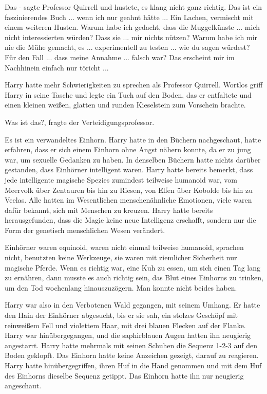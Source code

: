 \glqq{}Das -\grqq{} sagte Professor Quirrell und hustete, es klang nicht ganz richtig.
\glqq{}Das ist ein faszinierendes Buch ... wenn ich nur geahnt hätte ...\grqq{} Ein
Lachen, vermischt mit einem weiteren Husten. \glqq{}Warum habe ich gedacht, dass
die Muggelkünste ... mich nicht interessierten würden? Dass sie ... mir nichts
nützen? Warum habe ich mir nie die Mühe gemacht, es ... experimentell zu
testen ... wie du sagen würdest? Für den Fall ... dass meine Annahme ... falsch
war? Das erscheint mir im Nachhinein einfach nur töricht ...\grqq{}

Harry hatte mehr Schwierigkeiten zu sprechen als Professor Quirrell. Wortlos
griff Harry in seine Tasche und legte ein Tuch auf den Boden, das er entfaltete
und einen kleinen weißen, glatten und runden Kieselstein zum Vorschein brachte.

\glqq{}Was ist das?\grqq{}, fragte der Verteidigungsprofessor.

\glqq{}Es ist ein verwandeltes Einhorn.\grqq{} Harry hatte in den Büchern nachgeschaut,
hatte erfahren, dass er sich einem Einhorn ohne Angst nähern konnte, da er zu
jung war, um sexuelle Gedanken zu haben. In denselben Büchern hatte nichts
darüber gestanden, dass Einhörner intelligent waren. Harry hatte bereits
bemerkt, dass jede intelligente magische Spezies zumindest teilweise humanoid
war, vom Meervolk über Zentauren bis hin zu Riesen, von Elfen über Kobolde bis
hin zu Veelas. Alle hatten im Wesentlichen menschenähnliche Emotionen, viele
waren dafür bekannt, sich mit Menschen zu kreuzen. Harry hatte bereits
herausgefunden, dass die Magie keine neue Intelligenz erschafft, sondern nur die
Form der genetisch menschlichen Wesen verändert.

Einhörner waren equinoid, waren nicht einmal teilweise humanoid, sprachen nicht,
benutzten keine Werkzeuge, sie waren mit ziemlicher Sicherheit nur magische
Pferde. Wenn es richtig war, eine Kuh zu essen, um sich einen Tag lang zu
ernähren, dann musste es auch richtig sein, das Blut eines Einhorns zu trinken,
um den Tod wochenlang hinauszuzögern. Man konnte nicht beides haben.

Harry war also in den Verbotenen Wald gegangen, mit seinem Umhang. Er hatte den
Hain der Einhörner abgesucht, bis er sie sah, ein stolzes Geschöpf mit
reinweißem Fell und violettem Haar, mit drei blauen Flecken auf der Flanke.
Harry war hinübergegangen, und die saphirblauen Augen hatten ihn neugierig
angestarrt. Harry hatte mehrmals mit seinen Schuhen die Sequenz 1-2-3 auf den
Boden geklopft. Das Einhorn hatte keine Anzeichen gezeigt, darauf zu reagieren.
Harry hatte hinübergegriffen, ihren Huf in die Hand genommen und mit dem Huf des
Einhorns dieselbe Sequenz getippt. Das Einhorn hatte ihn nur neugierig
angeschaut.


